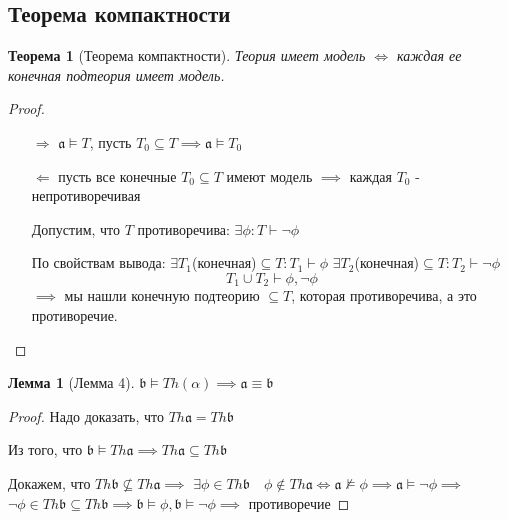 \documentclass[a4paper]{article}
\newtheorem{theorem}{Теорема}[section]
\newtheorem{lemma}{Лемма}[section]
\theoremstyle{definition}
\theoremstyle{remark}
\begin{document}
    \subsection{Теорема компактности}
    \begin{theorem}[Теорема компактности]
        Теория имеет модель $\Leftrightarrow$ каждая ее конечная подтеория имеет модель. 
    \end{theorem}
    \begin{proof}
        \begin{itemize}
            \item[$\Rightarrow$] $\mathfrak{a}\models T$, пусть $T_0\subseteq T\implies \mathfrak{a}\models T_0$ 
            \item[$\Leftarrow$] пусть все конечные $T_0\subseteq T$ имеют модель
            $\implies$ каждая $T_0$ - непротиворечивая

            Допустим, что $T$ противоречива: $\exists \phi: T\vdash \neg \phi$

            По свойствам вывода:
            $\exists T_1$(конечная)$\subseteq T: T_1\vdash \phi$
            $\exists T_2$(конечная)$\subseteq T: T_2\vdash \neg\phi$
            $$T_1 \cup T_2\vdash \phi, \neg \phi$$
            $\implies$ мы нашли конечную подтеорию $\subseteq T$, которая противоречива, а это противоречие.
        \end{itemize}
    \end{proof}
    \begin{lemma}[\hypertarget{Лемма 4}{Лемма 4}]
        $\mathfrak{b}\models Th (\alpha)\implies \mathfrak{a}\equiv \mathfrak{b}$
    \end{lemma}
    \begin{proof}
        Надо доказать, что $Th \mathfrak{a}= Th \mathfrak{b}$

        Из того, что $\mathfrak{b}\models Th \mathfrak{a}\implies Th \mathfrak{a} \subseteq Th \mathfrak{b} $
        
        Докажем, что $Th \mathfrak{b} \not \subseteq Th \mathfrak{a} \implies$
        $\exists \phi \in Th \mathfrak{b}\quad \phi \notin Th \mathfrak{a}\Leftrightarrow \mathfrak{a}\not\models \phi\implies \mathfrak{a}\models \neg \phi \implies$
        $\neg \phi \in Th \mathfrak{b}\subseteq Th \mathfrak{b}\implies \mathfrak{b}\models \phi, \mathfrak{b}\models \neg \phi\implies$ противоречие
    \end{proof}
\end{document}
